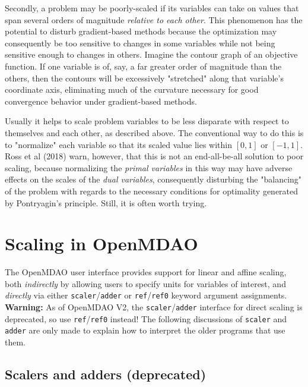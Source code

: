 \documentclass{article}
\begin{document}
Secondly, a problem may be poorly-scaled if its variables can take on values that span several orders of magnitude \textit{relative to each other}. This phenomenon has the potential to disturb gradient-based methods because the optimization may consequently be too sensitive to changes in some variables while not being sensitive enough to changes in others. Imagine the contour graph of an objective function. If one variable is of, say, a far greater order of magnitude than the others, then the contours will be excessively "stretched" along that variable's coordinate axis, eliminating much of the curvature necessary for good convergence behavior under gradient-based methods.

Usually it helps to scale problem variables to be less disparate with respect to themselves and each other, as described above. The conventional way to do this is to "normalize" each variable so that its scaled value lies within $[0,1]$ or $[-1,1]$. Ross et al (2018) warn, however, that this is not an end-all-be-all solution to poor scaling, because normalizing the \textit{primal variables} in this way may have adverse effects on the scales of the \textit{dual variables}, consequently disturbing the "balancing" of the problem with regards to the necessary conditions for optimality generated by Pontryagin's principle. Still, it is often worth trying.

\newpage
\section{Scaling in OpenMDAO}

The OpenMDAO user interface provides support for linear and affine scaling, both \textit{indirectly} by allowing users to specify units for variables of interest, and \textit{directly} via either \texttt{scaler}/\texttt{adder} or \texttt{ref}/\texttt{ref0} keyword argument assignments. \\

\noindent
\textbf{Warning:} As of OpenMDAO V2, the \texttt{scaler}/\texttt{adder} interface for direct scaling is deprecated, so use \texttt{ref}/\texttt{ref0} instead! The following discussions of \texttt{scaler} and \texttt{adder} are only made to explain how to interpret the older programs that use them.

\subsection*{Scalers and adders (deprecated)}
\end{document}
